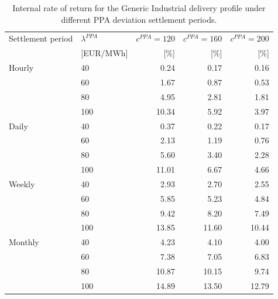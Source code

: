 \begin{table}[H]
\centering
\small
\caption{Internal rate of return for the Generic Industrial delivery profile under different PPA deviation settlement periods.}
\label{tab:irr_generic_industrial}
\begin{tabular}{llrrr}
\toprule
Settlement period & $\lambda^{PPA}$ & $c^{PPA}=120$ & $c^{PPA}=160$ & $c^{PPA}=200$ \\
 & [EUR/MWh] & [\%] & [\%] & [\%] \\
\midrule
Hourly & 40 & 0.24 & 0.17 & 0.16 \\
 & 60 & 1.67 & 0.87 & 0.53 \\
 & 80 & 4.95 & 2.81 & 1.81 \\
 & 100 & 10.34 & 5.92 & 3.97 \\
\addlinespace
Daily & 40 & 0.37 & 0.22 & 0.17 \\
 & 60 & 2.13 & 1.19 & 0.76 \\
 & 80 & 5.60 & 3.40 & 2.28 \\
 & 100 & 11.01 & 6.67 & 4.66 \\
\addlinespace
Weekly & 40 & 2.93 & 2.70 & 2.55 \\
 & 60 & 5.85 & 5.23 & 4.84 \\
 & 80 & 9.42 & 8.20 & 7.49 \\
 & 100 & 13.85 & 11.60 & 10.44 \\
\addlinespace
Monthly & 40 & 4.23 & 4.10 & 4.00 \\
 & 60 & 7.38 & 7.05 & 6.83 \\
 & 80 & 10.87 & 10.15 & 9.74 \\
 & 100 & 14.89 & 13.50 & 12.79 \\
\bottomrule
\end{tabular}
\end{table}


